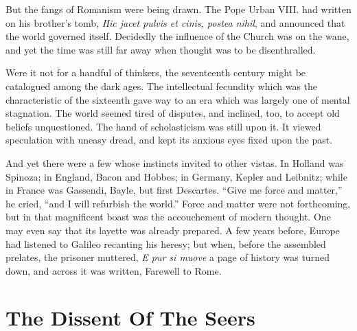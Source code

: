 \documentclass[]{book}
\begin{document}
But the fangs of Romanism were being drawn. The Pope Urban VIII. had
written on his brother's tomb, \emph{Hic jacet pulvis et cinis, postea
nihil}, and announced that the world governed itself. Decidedly the
influence of the Church was on the wane, and yet the time was still far
away when thought was to be disenthralled.

Were it not for a handful of thinkers, the seventeenth century might be
catalogued among the dark ages. The intellectual fecundity which was the
characteristic of the sixteenth gave way to an era which was largely one
of mental stagnation. The world seemed tired of disputes, and inclined,
too, to accept old beliefs unquestioned. The hand of scholasticism was
still upon it. It viewed speculation with uneasy dread, and kept its
anxious eyes fixed upon the past.

And yet there were a few whose instincts invited to other vistas. In
Holland was Spinoza; in England, Bacon and Hobbes; in Germany, Kepler
and Leibnitz; while in France was Gassendi, Bayle, but first Descartes.
``Give me force and matter,'' he cried, ``and I will refurbish the
world.'' Force and matter were not forthcoming, but in that magnificent
boast was the accouchement of modern thought. One may even say that its
layette was already prepared. A few years before, Europe had listened to
Galileo recanting his heresy; but when, before the assembled prelates,
the prisoner muttered, \emph{E pur si muove} a page of history was
turned down, and across it was written, Farewell to Rome.

\chapter{The Dissent Of The Seers}\label{the-dissent-of-the-seers}
\end{document}
